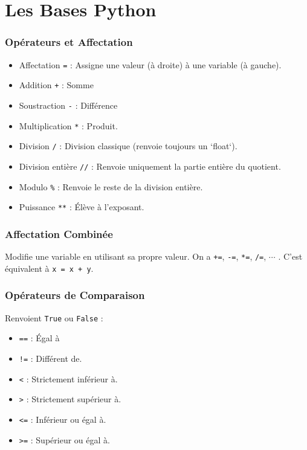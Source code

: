 \section{Les Bases Python}

\subsubsection{Opérateurs et Affectation}

\begin{itemize}
\item Affectation \texttt{=} : Assigne une valeur (à droite) à une variable (à gauche).
\item Addition \texttt{+} : Somme
\item Soustraction \texttt{-} : Différence
\item Multiplication \texttt{*} : Produit.
\item Division \texttt{/} : Division classique (renvoie toujours un `float`).
\item Division entière \texttt{//} : Renvoie uniquement la partie entière du quotient.
\item Modulo \texttt{\%} : Renvoie le reste de la division entière.
\item Puissance \texttt{**} : Élève à l'exposant.
\end{itemize}

\subsubsection{Affectation Combinée}
Modifie une variable en utilisant sa propre valeur. On a \texttt{+=}, \texttt{-=}, \texttt{*=}, \texttt{/=}, $\cdots$ . C'est équivalent à \texttt{x = x + y}.

\subsubsection{Opérateurs de Comparaison}
Renvoient \texttt{True} ou \texttt{False} :

\begin{itemize}
\item \texttt{==} : Égal à
\item \texttt{!=} : Différent de.
\item \texttt{<} : Strictement inférieur à.
\item \texttt{>} : Strictement supérieur à.
\item \texttt{<=} : Inférieur ou égal à.
\item \texttt{>=} : Supérieur ou égal à.
\end{itemize}

